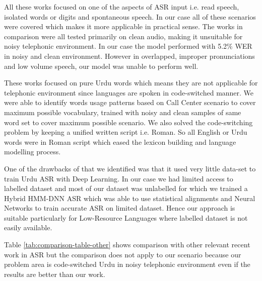 \documentclass{article}
\begin{document}
All these works focused on one of the aspects of ASR input i.e. read speech, isolated words or digits and spontaneous speech. In our case all of these scenarios were covered which makes it more applicable in practical sense. The works in comparison were all tested primarily on clean audio, making it unsuitable for noisy telephonic environment. In our case the model performed with 5.2\% WER in noisy and clean environment. However in overlapped, improper pronunciations and low volume speech, our model was unable to perform well.

These works focused on pure Urdu words which means they are not applicable for telephonic environment since languages are spoken in code-switched manner. We were able to identify words usage patterns based on Call Center scenario to cover maximum possible vocabulary, trained with noisy and clean samples of same word set to cover maximum possible scenario. We also solved the code-switching problem by keeping a unified written script i.e. Roman. So all English or Urdu words were in Roman script which eased the lexicon building and language modelling process. 

One of the drawbacks of \cite{sehar_gul_detecting_2020} that we identified was that it used very little data-set to train Urdu ASR with Deep Learning. In our case we had limited access to labelled dataset and most of our dataset was unlabelled for which we trained a Hybrid HMM-DNN ASR which was able to use statistical alignments and Neural Networks to train accurate ASR on limited dataset. Hence our approach is suitable particularly for Low-Resource Languages where labelled dataset is not easily available.

Table \ref{tab:comparison-table-other} shows comparison with other relevant recent work in ASR but the comparison does not apply to our scenario because our problem area is code-switched Urdu in noisy telephonic environment even if the results are better than our work.
\end{document}
